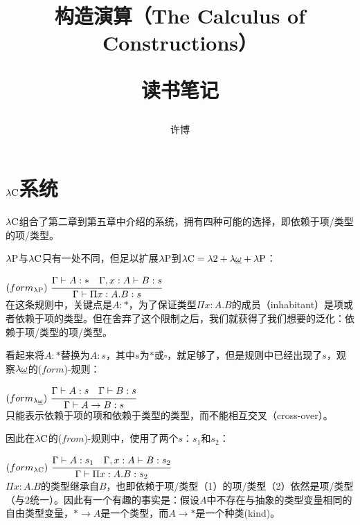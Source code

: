 \documentclass[UTF8]{article}
\title{构造演算（The Calculus of Constructions）\\[2ex]\begin{large}读书笔记\end{large}}
\author{许博}
\date{}
\begin{document}
\maketitle
	\section{$\lambda{\rm C}$系统}
		$\lambda{\rm C}$组合了第二章到第五章中介绍的系统，拥有四种可能的选择，即依赖于项/类型的项/类型。
		
		$\lambda{\rm P}$与$\lambda{\rm C}$只有一处不同，但足以扩展$\lambda{\rm P}$到$\lambda{\rm C} = \lambda{2} + \lambda{\uline{\omega}} + \lambda{\rm P}$：
		
		$(form_{\lambda{\rm P}})\ \cfrac{\Gamma\vdash A:*\ \ \ \Gamma,x:A\vdash B:s}{\Gamma\vdash\Pi x:A.B:s}$\\
		
		在这条规则中，关键点是$A:*$，为了保证类型$\Pi x:A.B$的成员（inhabitant）是项或者依赖于项的类型。但在舍弃了这个限制之后，我们就获得了我们想要的泛化：依赖于项/类型的项/类型。
		
		看起来将$A:*$替换为$A:s$，其中$s$为$*$或$\square$，就足够了，但是规则中已经出现了$s$，观察$\lambda{\uline{\omega}}$的($form$)-规则：
		
		$(form_{\lambda{\uline{\omega}}})\ \cfrac{\Gamma\vdash A:s\ \ \ \Gamma\vdash B:s}{\Gamma\vdash A\rightarrow B:s}$\\
		
		只能表示依赖于项的项和依赖于类型的类型，而不能相互交叉（cross-over）。
		
		因此在$\lambda{\rm C}$的($from$)-规则中，使用了两个$s$：$s_1$和$s_2$：
		
		$(form_{\lambda{\rm C}})\ \cfrac{\Gamma\vdash A:s_1\ \ \ \Gamma,x:A\vdash B:s_2}{\Gamma\vdash\Pi x:A.B:s_2}$\\
		
		$\Pi x:A.B$的类型继承自$B$，也即依赖于项/类型（1）的项/类型（2）依然是项/类型（与2统一）。因此有一个有趣的事实是：假设$A$中不存在与抽象的类型变量相同的自由类型变量，$*\rightarrow A$是一个类型，而$A\rightarrow *$是一个种类(kind)。
\end{document}
